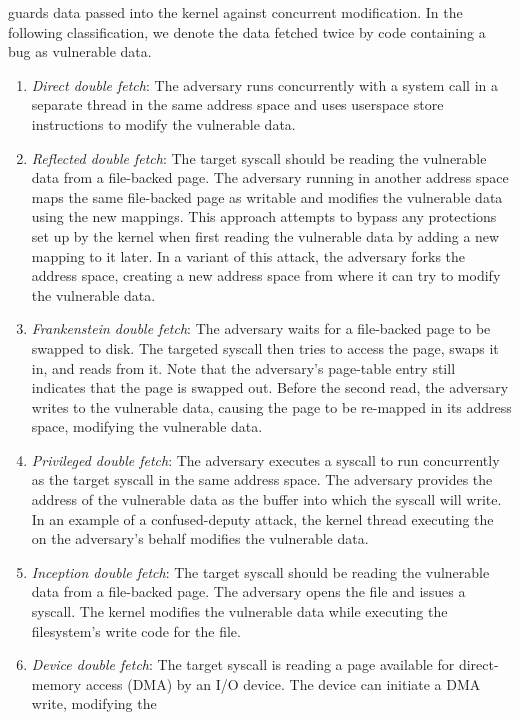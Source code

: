 \documentclass[letterpaper,twocolumn,10pt, anonymous]{article}
\begin{document}
\tiktok guards data passed into the kernel against concurrent modification.
In the following classification, we denote the data fetched twice
by code containing a \tocttou bug as vulnerable data.
\begin{enumerate}
  \item \label{attk:direct} \emph{Direct double fetch}: The adversary runs
  concurrently with a system call in a separate thread in the same address space
  and uses userspace store instructions to modify the vulnerable data.

  \item \label{attk:remapping} \emph{Reflected double fetch}: The target
  syscall should be reading the vulnerable data from a file-backed page.
  The adversary running in another address space maps the same file-backed page
  as writable and modifies the vulnerable data using the new mappings.
  This approach attempts to bypass any protections set up by the kernel
  when first reading the vulnerable data by adding a new mapping to it later.
  In a variant of this attack, the adversary forks the address space, 
  creating a new address space from where it can try to modify the vulnerable 
  data.

  \item \label{attk:swap} \emph{Frankenstein double fetch}: The adversary
  waits for a file-backed page to be swapped to disk. 
  The targeted syscall then tries to access the page, swaps it in, and 
  reads from it. 
  Note that the adversary's page-table entry still indicates that the page
  is swapped out.
  Before the second read, the adversary writes to the vulnerable data, 
  causing the page to be re-mapped in its address space, modifying the 
  vulnerable data.

  \item \label{attk:systemcall} \emph{Privileged double fetch}: The adversary
  executes a  syscall to run concurrently as the target syscall in 
  the same address space. 
  The adversary provides the address of the vulnerable data as the buffer 
  into which the  syscall will write.
  In an example of a confused-deputy attack, the kernel thread executing the
   on the adversary's behalf modifies the vulnerable data.

  \item \label{attk:writebuffers} \emph{Inception double fetch}: The 
  target syscall should be reading the vulnerable data from a file-backed 
  page. The adversary opens the file and issues a  syscall.
  The kernel modifies the vulnerable data while executing the filesystem's
  write code for the file.

  \item \label{attk:devicefiles} \emph{Device double fetch}: The target 
  syscall is reading a page available for direct-memory access (DMA) by 
  an I/O device. The device can initiate a DMA write, modifying the 

\end{enumerate}
\end{document}
